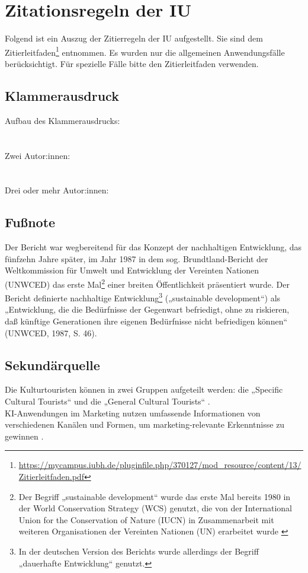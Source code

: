 \section{Zitationsregeln der IU}
Folgend ist ein Auszug der Zitierregeln der IU aufgestellt. Sie sind dem Zitierleitfaden\footnote{\url{https://mycampus.iubh.de/pluginfile.php/370127/mod_resource/content/13/Zitierleitfaden.pdf}} entnommen. Es wurden nur die allgemeinen Anwendungsfälle berücksichtigt. Für spezielle Fälle bitte den Zitierleitfaden verwenden.
\subsection{Klammerausdruck}
Aufbau des Klammerausdrucks:\\
\parencite[182-185]{primarysource}\\
\\
Zwei Autor:innen:\\
\parencite[182-185]{Doe2023}\\
\\
Drei oder mehr Autor:innen:\\
\parencite[182-185]{syme2011f}

\subsection{Fußnote}
Der Bericht war wegbereitend für das Konzept der nachhaltigen Entwicklung, das fünfzehn
Jahre später, im Jahr 1987 in dem sog. Brundtland-Bericht der Weltkommission für Umwelt
und Entwicklung der Vereinten Nationen (UNWCED) das erste Mal\footnote{Der Begriff „sustainable development“ wurde das erste Mal bereits 1980 in der World Conservation Strategy (WCS) genutzt, die von der International Union for the Conservation of Nature (IUCN) in Zusammenarbeit mit weiteren Organisationen der Vereinten Nationen (UN) erarbeitet wurde \parencite[182-185]{syme2011f}} einer breiten Öffentlichkeit
präsentiert wurde. Der Bericht definierte nachhaltige Entwicklung\footnote{In der deutschen Version des Berichts wurde allerdings der Begriff „dauerhafte Entwicklung“ genutzt.} („sustainable development“) als „Entwicklung, die die Bedürfnisse der Gegenwart befriedigt, ohne zu riskieren, daß künftige Generationen ihre eigenen Bedürfnisse nicht befriedigen können“ (UNWCED, 1987, S. 46). 

\subsection{Sekundärquelle}
Die Kulturtouristen können in zwei Gruppen aufgeteilt werden: die „Specific Cultural Tourists“ und die „General Cultural Tourists“ .\\
KI-Anwendungen im Marketing nutzen umfassende Informationen von verschiedenen Kanälen
und Formen, um marketing-relevante Erkenntnisse zu gewinnen .

